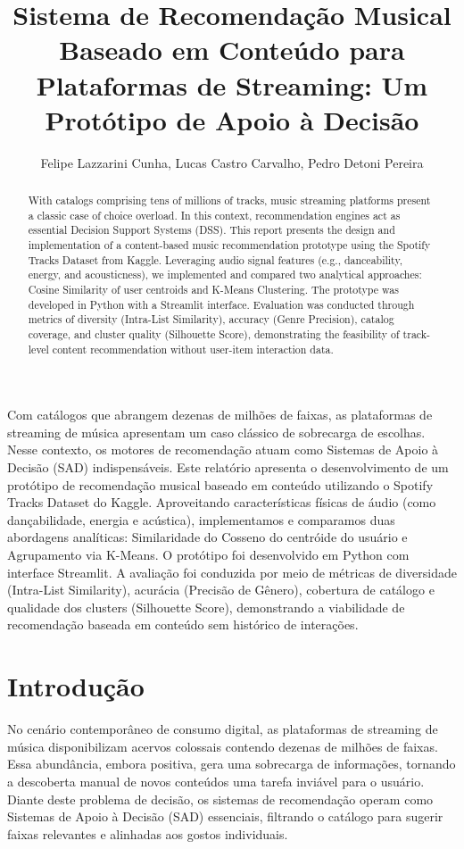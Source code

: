 \documentclass[12pt]{article}
\title{Sistema de Recomendação Musical Baseado em Conteúdo para Plataformas de Streaming: Um Protótipo de Apoio à Decisão}
\author{Felipe Lazzarini Cunha, Lucas Castro Carvalho, Pedro Detoni Pereira}
\begin{document}
\maketitle

\begin{abstract}
  With catalogs comprising tens of millions of tracks, music streaming platforms present a classic case of choice overload. In this context, recommendation engines act as essential Decision Support Systems (DSS). This report presents the design and implementation of a content-based music recommendation prototype using the Spotify Tracks Dataset from Kaggle. Leveraging audio signal features (e.g., danceability, energy, and acousticness), we implemented and compared two analytical approaches: Cosine Similarity of user centroids and K-Means Clustering. The prototype was developed in Python with a Streamlit interface. Evaluation was conducted through metrics of diversity (Intra-List Similarity), accuracy (Genre Precision), catalog coverage, and cluster quality (Silhouette Score), demonstrating the feasibility of track-level content recommendation without user-item interaction data.
\end{abstract}

\begin{resumo}
  Com catálogos que abrangem dezenas de milhões de faixas, as plataformas de streaming de música apresentam um caso clássico de sobrecarga de escolhas. Nesse contexto, os motores de recomendação atuam como Sistemas de Apoio à Decisão (SAD) indispensáveis. Este relatório apresenta o desenvolvimento de um protótipo de recomendação musical baseado em conteúdo utilizando o Spotify Tracks Dataset do Kaggle. Aproveitando características físicas de áudio (como dançabilidade, energia e acústica), implementamos e comparamos duas abordagens analíticas: Similaridade do Cosseno do centróide do usuário e Agrupamento via K-Means. O protótipo foi desenvolvido em Python com interface Streamlit. A avaliação foi conduzida por meio de métricas de diversidade (Intra-List Similarity), acurácia (Precisão de Gênero), cobertura de catálogo e qualidade dos clusters (Silhouette Score), demonstrando a viabilidade de recomendação baseada em conteúdo sem histórico de interações.
\end{resumo}

\section{Introdução}
No cenário contemporâneo de consumo digital, as plataformas de streaming de música disponibilizam acervos colossais contendo dezenas de milhões de faixas. Essa abundância, embora positiva, gera uma sobrecarga de informações, tornando a descoberta manual de novos conteúdos uma tarefa inviável para o usuário. Diante deste problema de decisão, os sistemas de recomendação operam como Sistemas de Apoio à Decisão (SAD) essenciais, filtrando o catálogo para sugerir faixas relevantes e alinhadas aos gostos individuais.
\end{document}
